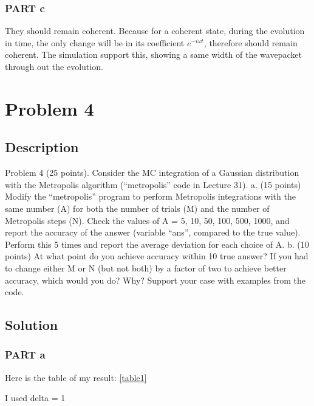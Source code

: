 \documentclass[11pt,letterpaper]{article}
\begin{document}
\subsubsection{PART c}
They should remain coherent. Because for a coherent state, during the evolution in time, the only change will be in its coefficient $e^{-i\omega{t}}$, therefore should remain coherent. The simulation support this, showing a same width of the wavepacket through out the evolution.


\section{Problem 4}
\subsection{Description}
Problem 4 (25 points). Consider the MC integration of a Gaussian
distribution with the Metropolis algorithm (“metropolis” code in Lecture 31).
a. (15 points) Modify the “metropolis” program to perform Metropolis
      integrations with the same number (A) for both the number of trials (M)
     and the number of Metropolis steps (N). Check the values of A = 5, 10,
    50, 100, 500, 1000, and report the accuracy of the answer (variable
   “ans”, compared to the true value). Perform this 5 times and report the
      average deviation for each choice of A.
b. (10 points) At what point do you achieve accuracy within 10%
  true answer? If you had to change either M or N (but not both) by a
 factor of two to achieve better accuracy, which would you do? Why?
Support your case with examples from the code.
\subsection{Solution}
\subsubsection{PART a}

Here is the table of my result: \ref{table1}

I used delta = 1
\end{document}
